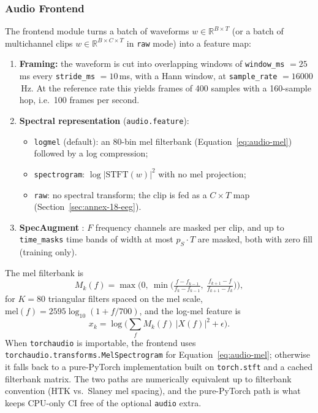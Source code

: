 \subsubsection{Audio Frontend}

The frontend module turns a batch of waveforms $w \in \mathbb{R}^{B \times T}$ (or a batch of multichannel clips $w \in \mathbb{R}^{B \times C \times T}$ in \texttt{raw} mode) into a feature map:

\begin{enumerate}[leftmargin=*]
    \item \textbf{Framing:} the waveform is cut into overlapping windows of \texttt{window\_ms} $=25$\,ms every \texttt{stride\_ms} $=10$\,ms, with a Hann window, at \texttt{sample\_rate} $=16000$\,Hz. At the reference rate this yields frames of 400 samples with a 160-sample hop, i.e.\ 100 frames per second.
    \item \textbf{Spectral representation} (\texttt{audio.feature}):
    \begin{itemize}[leftmargin=*]
        \item \texttt{logmel} (default): an $80$-bin mel filterbank (Equation~\ref{eq:audio-mel}) followed by a log compression;
        \item \texttt{spectrogram}: $\log|\mathrm{STFT}(w)|^2$ with no mel projection;
        \item \texttt{raw}: no spectral transform; the clip is fed as a $C \times T$ map (Section~\ref{sec:annex-18-eeg}).
    \end{itemize}
    \item \textbf{SpecAugment} \citep{Park2019}: $F$ frequency channels are masked per clip, and up to \texttt{time\_masks} time bands of width at most $p_S \cdot T$ are masked, both with zero fill (training only).
\end{enumerate}

The mel filterbank is
\begin{equation}
M_k(f) = \max\Big(0,\ \min\Big(\tfrac{f-f_{k-1}}{f_k-f_{k-1}},\ \tfrac{f_{k+1}-f}{f_{k+1}-f_k}\Big)\Big),
\label{eq:audio-filterbank}
\end{equation}
for $K = 80$ triangular filters spaced on the mel scale, $\mathrm{mel}(f) = 2595 \log_{10}(1 + f/700)$, and the log-mel feature is
\begin{equation}
x_k = \log\Big(\sum_{f} M_k(f)\,|X(f)|^2 + \epsilon\Big).
\label{eq:audio-mel}
\end{equation} When \texttt{torchaudio} is importable, the frontend uses \texttt{torchaudio.transforms.MelSpectrogram} for Equation~\ref{eq:audio-mel}; otherwise it falls back to a pure-PyTorch implementation built on \texttt{torch.stft} and a cached filterbank matrix. The two paths are numerically equivalent up to filterbank convention (HTK vs.\ Slaney mel spacing), and the pure-PyTorch path is what keeps CPU-only CI free of the optional \texttt{audio} extra.

